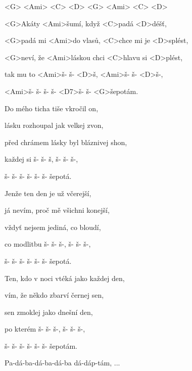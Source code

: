 

<G> <Ami> <C> <D> <G> <Ami> <C> <D>

\zs
<G>Akáty <Ami>šumí, když <C>padá <D>déšť,

<G>padá mi <Ami>do vlasů, <C>chce mi je <D>splést,

<G>neví, že <Ami>láskou chci <C>hlavu si <D>plést,

tak mu to <Ami>š- š- <D>š, <Ami>š- š- <D>š-,

<Ami>š- š- š- š- <D7>š- š- <G>šepotám.
\ks

\zs
Do mého ticha tiše vkročil on,

lásku rozhoupal jak velkej zvon,

před chrámem lásky byl bláznivej shon,

každej si š- š- š, š- š- š-,

š- š- š- š- š- š- šepotá.
\ks

\zs
Jenže ten den je už včerejší,

já nevím, proč mě všichni konejší,

vždyť nejsem jediná, co bloudí,

co modlitbu š- š- š-, š- š- š-,

š- š- š- š- š- š- šepotá.
\ks

\zs
Ten, kdo v noci vtéká jako každej den,

vím, že někdo zbarví černej sen,

sen zmoklej jako dnešní den,

po kterém š- š- š-, š- š- š-,

š- š- š- š- š- š- šepotám.
\ks

\zs
Pa-dá-ba-dá-ba-dá-ba dá-dáp-tám, ...
\ks

\kp
